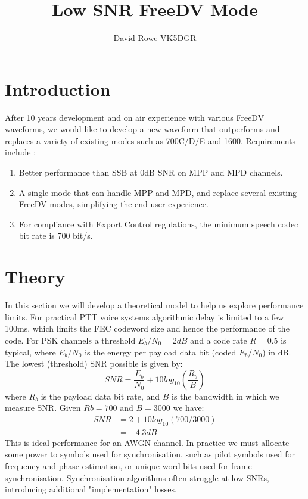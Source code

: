 \documentclass{article}
\begin{document}
\title{Low SNR FreeDV Mode}
\author{David Rowe VK5DGR}
\maketitle

\section{Introduction}

After 10 years development and on air experience with various FreeDV waveforms, we would like to develop a new waveform that outperforms and replaces a variety of existing modes such as 700C/D/E and 1600.  Requirements include \cite{freedv-020}:
\begin{enumerate}
\item Better performance than SSB at 0dB SNR on MPP and MPD channels.
\item A single mode that can handle MPP and MPD, and replace several existing FreeDV modes, simplifying the end user experience.
\item For compliance with Export Control regulations, the minimum speech codec bit rate is 700 bit/s.
\end{enumerate}

\section{Theory}

In this section we will develop a theoretical model to help us explore performance limits.  For practical PTT voice systems algorithmic delay is limited to a few 100ms, which limits the FEC codeword size and hence the performance of the code.  For PSK channels a threshold $E_b/N_0=2dB$ and a code rate $R=0.5$ is typical, where $E_b/N_0$ is the energy per payload data bit (coded $E_b/N_0$) in dB.  The lowest (threshold) SNR possible is given by:
\begin{equation}
SNR = \frac{E_b}{N_0} + 10log_{10}\left(\frac{R_b}{B}\right)
\end{equation}
where $R_b$ is the payload data bit rate, and $B$ is the bandwidth in which we measure SNR.  Given $Rb=700$ and $B=3000$ we have:
\begin{equation}
\begin{split}
SNR &= 2 + 10log_{10}(700/3000) \\
    &= -4.3 dB
\end{split}
\end{equation}
This is ideal performance for an AWGN channel.  In practice we must allocate some power to symbols used for synchronisation, such as pilot symbols used for frequency and phase estimation, or unique word bits used for frame synchronisation.  Synchronisation algorithms often struggle at low SNRs, introducing additional "implementation" losses.
\end{document}

